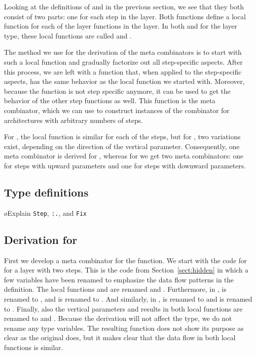 \documentclass[preprint,natbib]{sigplanconf}
\begin{document}
Looking at the definitions of  and  in the previous section, we see that they both consist of two parts: one for each step in the layer. Both functions define a local function for each of the layer functions in the layer. In both  and  for the  layer type, these local functions are called  and . 

The method we use for the derivation of the meta combinators is to start with such a local function and gradually factorize out all step-specific aspects. After this process, we are left with a function that, when applied to the step-specific aspects, has the same behavior as the local function we started with. Moreover, because the function is not step specific anymore, it can be used to get the behavior of the other step functions as well. This function is the meta combinator, which we can use to construct instances of the combinator for architectures with arbitrary numbers of steps. 

\bc
 For , the local function is similar for each of the steps, but for , two variations exist, depending on the direction of the vertical parameter. Consequently, one meta combinator is derived for , whereas for  we get two meta combinators: one for steps with upward parameters and one for steps with downward parameters.
\ec
 
 
%																
\subsection{Type definitions} \label{subsecttypedef}

\bl
\o Explain \verb|Step|, \verb|:.|, and \verb|Fix|
\el


%																
\subsection{Derivation for }

First we develop a meta combinator for the  function. We start with the code for  for a layer with two steps. This is the code from Section~\ref{sect:hidden} in which a few variables have been renamed to emphasize the data flow patterns in the definition.
\bc The local functions  and  are renamed  and . Furthermore, in ,  is renamed to , and  is renamed to . And similarly, in ,  is renamed to  and  is renamed to . Finally, also the vertical parameters and results in both local functions are renamed to  and . Because the derivation will not affect the type, we do not rename any type variables. The resulting function does not show its purpose as clear as the original does, but it makes clear that the data flow in both local functions is similar. \ec
\end{document}
